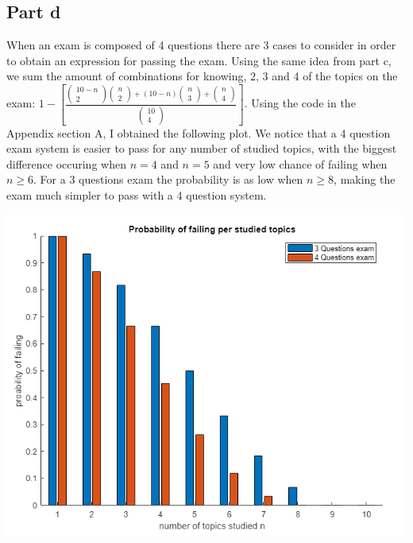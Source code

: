 \documentclass[10pt]{article}
\begin{document}
\subsection*{Part d}
When an exam is composed of 4 questions there are 3 cases to consider in order to obtain an expression for passing the exam.
Using the same idea from part c, we sum the amount of combinations for knowing, 2, 3 and 4 of the topics on the exam:
$1 - [\frac{\begin{pmatrix} 10 - n \\ 2 \end{pmatrix}\begin{pmatrix} n \\ 2 \end{pmatrix}+(10 - n)\begin{pmatrix} n \\ 3 \end{pmatrix} + \begin{pmatrix} n \\ 4 \end{pmatrix}}{\begin{pmatrix} 10 \\ 4 \end{pmatrix}}]$.
Using the code in the Appendix section A,  I obtained the following plot. We notice that
a 4 question exam system is easier to pass for any number of studied topics, with the biggest difference
occuring when $ n = 4 $ and $ n = 5 $ and very low chance of failing when $ n \geq 6$. For a 3 questions exam the probability
is as low when $ n \geq 8 $, making the exam much simpler to pass with a 4 question system.
\begin{center}
    \includegraphics[scale=0.4]{final_11}
\end{center}
\end{document}
